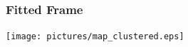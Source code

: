 \begin{frame}
\begin{columns}[T]
{\begin{column}{0.32\textwidth}
			\end{column}
			}
		\end{columns}
	\end{frame}

	\begin{frame}
		\frametitle{Fitted Frame}
		\centering
		\texttt{[image: pictures/map\_clustered.eps]}
	\end{frame}

